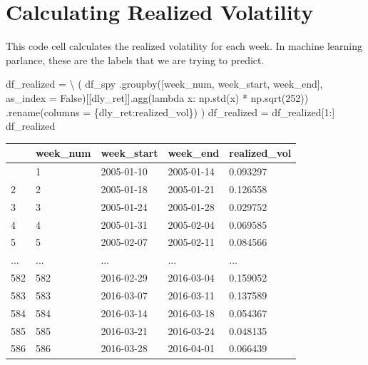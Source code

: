 \documentclass[
  letterpaper,
  DIV=11,
  numbers=noendperiod]{scrreprt}
\newenvironment{Shaded}{\begin{snugshade}}{\end{snugshade}}
\newcommand{\DecValTok}[1]{\textcolor[rgb]{0.68,0.00,0.00}{#1}}
\newcommand{\KeywordTok}[1]{\textcolor[rgb]{0.00,0.23,0.31}{#1}}
\newcommand{\NormalTok}[1]{\textcolor[rgb]{0.00,0.23,0.31}{#1}}
\newcommand{\OperatorTok}[1]{\textcolor[rgb]{0.37,0.37,0.37}{#1}}
\newcommand{\StringTok}[1]{\textcolor[rgb]{0.13,0.47,0.30}{#1}}
\newcommand{\VariableTok}[1]{\textcolor[rgb]{0.07,0.07,0.07}{#1}}
\begin{document}
\hypertarget{calculating-realized-volatility-1}{%
\section{Calculating Realized
Volatility}\label{calculating-realized-volatility-1}}

This code cell calculates the realized volatility for each week. In
machine learning parlance, these are the labels that we are trying to
predict.

\begin{Shaded}
\begin{Highlighting}[]
\NormalTok{df\_realized }\OperatorTok{=} \OperatorTok{\textbackslash{}}
\NormalTok{    (}
\NormalTok{    df\_spy}
\NormalTok{        .groupby([}\StringTok{\textquotesingle{}week\_num\textquotesingle{}}\NormalTok{, }\StringTok{\textquotesingle{}week\_start\textquotesingle{}}\NormalTok{, }\StringTok{\textquotesingle{}week\_end\textquotesingle{}}\NormalTok{], as\_index }\OperatorTok{=} \VariableTok{False}\NormalTok{)[[}\StringTok{\textquotesingle{}dly\_ret\textquotesingle{}}\NormalTok{]].agg(}\KeywordTok{lambda}\NormalTok{ x: np.std(x) }\OperatorTok{*}\NormalTok{ np.sqrt(}\DecValTok{252}\NormalTok{))}
\NormalTok{        .rename(columns }\OperatorTok{=}\NormalTok{ \{}\StringTok{\textquotesingle{}dly\_ret\textquotesingle{}}\NormalTok{:}\StringTok{\textquotesingle{}realized\_vol\textquotesingle{}}\NormalTok{\})}
\NormalTok{    )}
\NormalTok{df\_realized }\OperatorTok{=}\NormalTok{ df\_realized[}\DecValTok{1}\NormalTok{:]}
\NormalTok{df\_realized}
\end{Highlighting}
\end{Shaded}

\begin{longtable}[]{@{}lllll@{}}
\toprule\noalign{}
& week\_num & week\_start & week\_end & realized\_vol \\
\midrule\noalign{}
\endhead
\bottomrule\noalign{}
\endlastfoot
1 & 1 & 2005-01-10 & 2005-01-14 & 0.093297 \\
2 & 2 & 2005-01-18 & 2005-01-21 & 0.126558 \\
3 & 3 & 2005-01-24 & 2005-01-28 & 0.029752 \\
4 & 4 & 2005-01-31 & 2005-02-04 & 0.069585 \\
5 & 5 & 2005-02-07 & 2005-02-11 & 0.084566 \\
... & ... & ... & ... & ... \\
582 & 582 & 2016-02-29 & 2016-03-04 & 0.159052 \\
583 & 583 & 2016-03-07 & 2016-03-11 & 0.137589 \\
584 & 584 & 2016-03-14 & 2016-03-18 & 0.054367 \\
585 & 585 & 2016-03-21 & 2016-03-24 & 0.048135 \\
586 & 586 & 2016-03-28 & 2016-04-01 & 0.066439 \\
\end{longtable}
\end{document}
